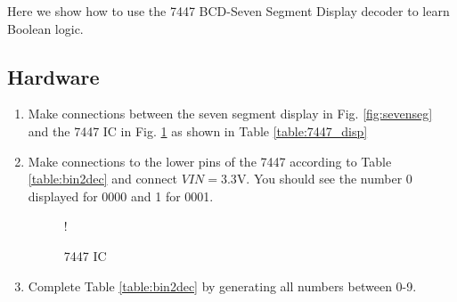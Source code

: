 Here we show how to use the 7447 BCD-Seven Segment Display decoder to learn Boolean logic.
\subsection{Hardware}
\begin{enumerate}[label=\arabic*.,ref=\theenumi]
\item
Make connections between the seven segment display in Fig. \ref{fig:sevenseg} and the  7447 IC in Fig. \ref{fig:7447} as shown in Table \ref{table:7447_disp}
%
\iffalse
\begin{table}[H]
\centering

\caption{7447 components}
\label{table:components-7447}
\end{table}
\fi
%
\begin{table}[H]
\centering

\caption{}
\label{table:7447_disp}
\end{table}
%
\iffalse
\begin{figure}[H]
\begin{center}
\resizebox {0.5\columnwidth} {!} {

}
\end{center}
\caption{}
\label{fig:sevenseg}
\end{figure}
\fi
\item
Make connections to the lower pins of the 7447 according to
Table \ref{table:bin2dec} and connect $VIN = 3.3$V. You should see the number 0 displayed for 0000 and 1 for 0001.

%
\begin{table}[H]
\centering

\caption{}
\label{table:bin2dec}
\end{table}
%
\begin{figure}[H]
	\centering
\resizebox {\columnwidth} {!} {

}
\caption{7447 IC}
\label{fig:7447}
\end{figure}
%
\item
Complete Table \ref{table:bin2dec} by generating all numbers between 0-9.

	\end{enumerate}
